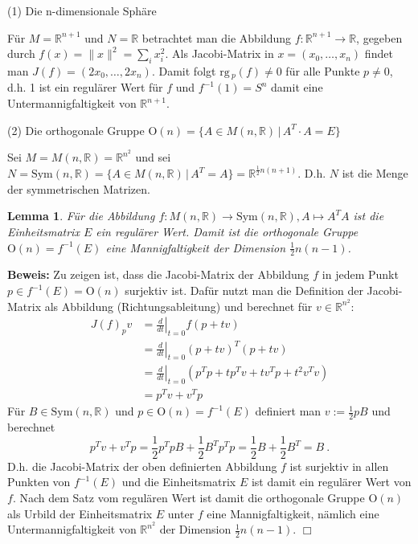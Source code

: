 \documentclass[12pt,a4paper]{article}
\def\R{\mathbb{R}}
\def\O{\mathrm{O}}
\def\rg{\mathrm{rg}\,}
\def\Sym{\mathrm{Sym}}
\newtheorem{Lemma}{Lemma}[section]
\def\proof{\noindent\textbf{Beweis:}\quad}
\def\qed{\quad\hfill\ensuremath{\Box}}
\begin{document}
(1) Die n-dimensionale Sph\"are

\medskip

F\"ur $M=\R^{n+1}$ und $N=\R$
betrachtet man die Abbildung $f:\R^{n+1}\rightarrow \R$, gegeben durch $f(x) = \|x\|^2 = \sum_i x_i^2$.
Als Jacobi-Matrix in $x=(x_0, \ldots, x_n)$ findet man $J(f)= (2x_0,\ldots, 2x_n)$. Damit folgt
$\rg_p(f)\neq 0$ f\"ur alle Punkte $p\neq 0$, d.h. 1 ist ein regul\"arer Wert f\"ur $f$ und
$f^{-1}(1)= S^n$ damit eine Untermannigfaltigkeit von $\R^{n+1}$.

\bigskip

(2) Die orthogonale Gruppe $\O(n) = \{A \in M(n,\R) \,|\, A^T\cdot A = E\}$

\medskip

Sei $M=M(n,\R)= \R^{n^2}$ und sei $N= \Sym(n,\R) = \{ A \in M(n,\R) \,|\, A^T=A\}= \R^{\frac12n(n+1)}$.
D.h. $N$ ist die Menge der symmetrischen Matrizen.

\begin{Lemma}
F\"ur die Abbildung $f:M(n,\R)\rightarrow \Sym(n,\R), A \mapsto A^TA$ ist die Einheitsmatrix $E$ ein regul\"arer
Wert. Damit ist die orthogonale Gruppe $\O(n)=f^{-1}(E)$ eine Mannigfaltigkeit der Dimension $\frac12n(n-1)$.
\end{Lemma}
\proof
Zu zeigen ist, dass die Jacobi-Matrix der Abbildung $f$ in jedem Punkt $p\in f^{-1}(E)=\O(n)$ surjektiv ist.
Daf\"ur nutzt man die Definition der Jacobi-Matrix als Abbildung (Richtungsableitung) und berechnet
f\"ur $v\in \R^{n^2}$:
$$
\begin{array}{rl}
J(f)_p v &=\left. \frac{d}{dt}\right|_{t=0} f(p + t v) \\[1ex]
         & =   \left. \frac{d}{dt}\right|_{t=0} (p + tv)^T(p+tv)\\[1ex]
         &= \left.\frac{d}{dt}\right|_{t=0} (p^Tp + t p^Tv + tv^Tp + t^2v^Tv)\\[1ex]
         &= p^Tv + v^Tp
\end{array}
$$
F\"ur $B\in \Sym(n,\R)$ und $p \in \O(n)=f^{-1}(E)$ definiert man $v:= \frac12 p B$ und berechnet
$$
p^Tv + v^Tp = \frac12 p^T p B + \frac12 B^Tp^Tp = \frac12 B + \frac12 B^T = B \ .
$$
D.h. die Jacobi-Matrix der oben definierten Abbildung $f$ ist surjektiv in allen Punkten von $f^{-1}(E)$ und
die Einheitsmatrix $E$ ist damit ein regul\"arer Wert von $f$.
Nach dem Satz vom regul\"aren Wert ist damit die orthogonale Gruppe $\O(n)$ als Urbild der Einheitsmatrix $E$ unter
$f$ eine Mannigfaltigkeit, n\"amlich eine Untermannigfaltigkeit von $\R^{n^2}$ der Dimension $\frac12 n(n-1)$.
\qed
\end{document}
